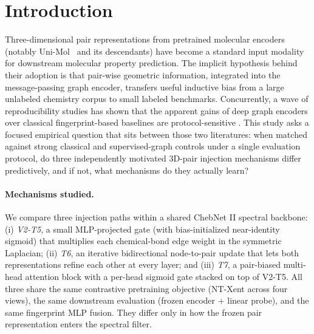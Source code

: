 
\section{Introduction}
\label{sec:intro}

Three-dimensional pair representations from pretrained molecular encoders
(notably Uni-Mol~\cite{uni-mol2023} and its descendants) have become a
standard input modality for downstream molecular property prediction.
The implicit hypothesis behind their adoption is that pair-wise geometric
information, integrated into the message-passing graph encoder, transfers
useful inductive bias from a large unlabeled chemistry corpus to small
labeled benchmarks. Concurrently, a wave of reproducibility studies has
shown that the apparent gains of deep graph encoders over classical
fingerprint-based baselines are protocol-sensitive
\cite{deng2023systematic, vanTilborg2024limitations, pocha2023atomic}.
This study asks a focused empirical question that sits between those two
literatures: when matched against strong classical and supervised-graph
controls under a single evaluation protocol, do three independently
motivated 3D-pair injection mechanisms differ predictively, and if not,
what mechanisms do they actually learn?

\paragraph{Mechanisms studied.}
We compare three injection paths within a shared ChebNet II
\cite{he2022chebnetii} spectral backbone:
(i) \emph{V2-T5}, a small MLP-projected gate (with bias-initialized
near-identity sigmoid) that multiplies each chemical-bond edge weight in
the symmetric Laplacian;
(ii) \emph{T6}, an iterative bidirectional node-to-pair update that lets
both representations refine each other at every layer; and
(iii) \emph{T7}, a pair-biased multi-head attention block with a per-head
sigmoid gate stacked on top of V2-T5. All three share the same
contrastive pretraining objective (NT-Xent across four views), the same
downstream evaluation (frozen encoder + linear probe), and the same
fingerprint MLP fusion. They differ only in how the frozen pair
representation enters the spectral filter.

